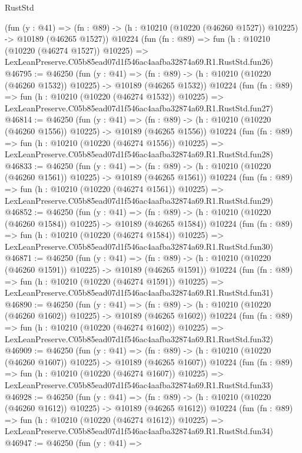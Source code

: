 \begin{lexlean}{RustStd}
\begin{coremodule}
    (fun (y : @41) =>
    (fn : @89) -> (h : @10210 (@10220 (@46260 @1527)) @10225) -> @10189 (@46265 @1527))
    @10224
    (fun (fn : @89) =>
    fun (h : @10210 (@10220 (@46274 @1527)) @10225) =>
    LexLeanPreserve.C05b85ead07d1f546ac4aafba32874a69.R1.RustStd.fun26)
@46795 := @46250
    (fun (y : @41) =>
    (fn : @89) -> (h : @10210 (@10220 (@46260 @1532)) @10225) -> @10189 (@46265 @1532))
    @10224
    (fun (fn : @89) =>
    fun (h : @10210 (@10220 (@46274 @1532)) @10225) =>
    LexLeanPreserve.C05b85ead07d1f546ac4aafba32874a69.R1.RustStd.fun27)
@46814 := @46250
    (fun (y : @41) =>
    (fn : @89) -> (h : @10210 (@10220 (@46260 @1556)) @10225) -> @10189 (@46265 @1556))
    @10224
    (fun (fn : @89) =>
    fun (h : @10210 (@10220 (@46274 @1556)) @10225) =>
    LexLeanPreserve.C05b85ead07d1f546ac4aafba32874a69.R1.RustStd.fun28)
@46833 := @46250
    (fun (y : @41) =>
    (fn : @89) -> (h : @10210 (@10220 (@46260 @1561)) @10225) -> @10189 (@46265 @1561))
    @10224
    (fun (fn : @89) =>
    fun (h : @10210 (@10220 (@46274 @1561)) @10225) =>
    LexLeanPreserve.C05b85ead07d1f546ac4aafba32874a69.R1.RustStd.fun29)
@46852 := @46250
    (fun (y : @41) =>
    (fn : @89) -> (h : @10210 (@10220 (@46260 @1584)) @10225) -> @10189 (@46265 @1584))
    @10224
    (fun (fn : @89) =>
    fun (h : @10210 (@10220 (@46274 @1584)) @10225) =>
    LexLeanPreserve.C05b85ead07d1f546ac4aafba32874a69.R1.RustStd.fun30)
@46871 := @46250
    (fun (y : @41) =>
    (fn : @89) -> (h : @10210 (@10220 (@46260 @1591)) @10225) -> @10189 (@46265 @1591))
    @10224
    (fun (fn : @89) =>
    fun (h : @10210 (@10220 (@46274 @1591)) @10225) =>
    LexLeanPreserve.C05b85ead07d1f546ac4aafba32874a69.R1.RustStd.fun31)
@46890 := @46250
    (fun (y : @41) =>
    (fn : @89) -> (h : @10210 (@10220 (@46260 @1602)) @10225) -> @10189 (@46265 @1602))
    @10224
    (fun (fn : @89) =>
    fun (h : @10210 (@10220 (@46274 @1602)) @10225) =>
    LexLeanPreserve.C05b85ead07d1f546ac4aafba32874a69.R1.RustStd.fun32)
@46909 := @46250
    (fun (y : @41) =>
    (fn : @89) -> (h : @10210 (@10220 (@46260 @1607)) @10225) -> @10189 (@46265 @1607))
    @10224
    (fun (fn : @89) =>
    fun (h : @10210 (@10220 (@46274 @1607)) @10225) =>
    LexLeanPreserve.C05b85ead07d1f546ac4aafba32874a69.R1.RustStd.fun33)
@46928 := @46250
    (fun (y : @41) =>
    (fn : @89) -> (h : @10210 (@10220 (@46260 @1612)) @10225) -> @10189 (@46265 @1612))
    @10224
    (fun (fn : @89) =>
    fun (h : @10210 (@10220 (@46274 @1612)) @10225) =>
    LexLeanPreserve.C05b85ead07d1f546ac4aafba32874a69.R1.RustStd.fun34)
@46947 := @46250
    (fun (y : @41) =>

\end{coremodule}
\end{lexlean}
